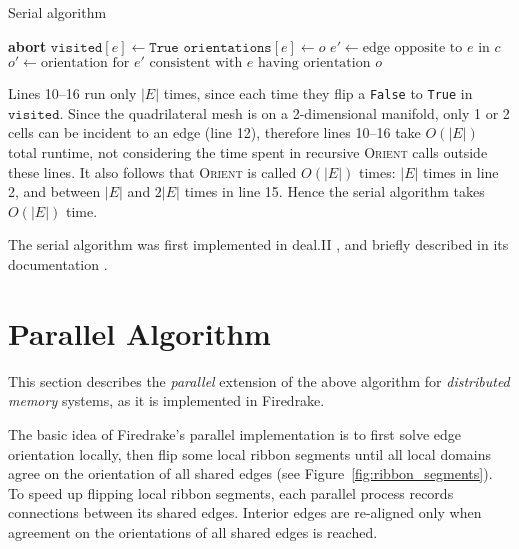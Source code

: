 \documentclass[oneeqnum,onethmnum,onefignum,onetabnum]{siamltex1213}
\begin{document}
\begin{algorithm}
  \caption{Serial algorithm}
  \label{alg:serial}
  \begin{algorithmic}[1]
      \State {}
    \EndFor
    \Statex
      \State \textbf{abort}
      \EndIf
    \Else
      \State $ \mathtt{visited}[e] \gets \mathtt{True} $
      \State $ \mathtt{orientations}[e] \gets o $
        \State $ e' \gets \text{edge opposite to } e \text{ in } c $
        \State $ o' \gets \text{orientation for } e' \text{ consistent with } e \text{ having orientation } o $
        \State {}
      \EndFor
    \EndIf
    \EndProcedure
  \end{algorithmic}
\end{algorithm}

Lines 10--16 run only $ |E| $ times, since each time they flip
a \texttt{False} to \texttt{True} in $ \mathtt{visited} $. Since the
quadrilateral mesh is on a 2-dimensional manifold, only 1 or 2 cells
can be incident to an edge (line 12), therefore lines 10--16 take
$ O(|E|) $ total runtime, not considering the time spent in recursive
\textsc{Orient} calls outside these lines. It also follows that
\textsc{Orient} is called $ O(|E|) $ times: $ |E| $ times in line 2,
and between $ |E| $ and $ 2 |E| $ times in line 15. Hence the serial
algorithm takes $ O(|E|) $ time.

The serial algorithm was first implemented in deal.II
\cite{Bangerth2007}, and briefly described in its
documentation \cite{Bangerth}.

\section{Parallel Algorithm}
\label{sec:parallel}

This section describes the \emph{parallel} extension of the above
algorithm for \emph{distributed memory} systems, as it is
implemented in Firedrake.

The basic idea of Firedrake's parallel implementation is to first
solve edge orientation locally, then flip some local ribbon segments
until all local domains agree on the orientation of all shared edges
(see Figure~\ref{fig:ribbon_segments}).
To speed up flipping local ribbon segments, each parallel process
records connections between its shared edges. Interior edges are
re-aligned only when agreement on the orientations of all shared
edges is reached.
\end{document}

